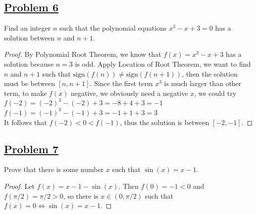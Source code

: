 \documentclass[10pt,letterpaper]{article}
\begin{document}
	
	\subsection*{{\color{purple}\underline{Problem 6}}}
	Find an integer $n$ such that the polynomial equations $x^3 - x + 3 = 0$ has a solution
	between $n$ and $n + 1$.
	\begin{proof}
	By Polynomial Root Theorem, we know that $f(x) = x^3 - x + 3$ has a solution because $n = 3$ is odd.
		Apply Location of Root Theorem, we want to find $n$ and $n + 1$ such that $\mathrm{sign}(f(n)) \neq \mathrm{sign}(f(n+1))$,
		then the solution must be between $[n, n+1]$. Since the first term $x^3$ is much larger than other term, to make $f(x)$ negative,
		we obviously need a negative $x$, we could try \\
		$f(-2) = (-2)^3 - (-2) + 3 = -8 + 4 + 3 = -1$ \\
		$f(-1) = (-1)^3 - (-1) + 3 = -1 + 1 + 3 = 3$ \\
		It follows that $f(-2) < 0 < f(-1)$, thus the solution is between $[-2, -1]$.
	\end{proof}
	
	\subsection*{{\color{purple}\underline{Problem 7}}}
	Prove that there is some number $x$ such that $\sin(x) = x - 1$.
	\begin{proof}
		Let $f(x) = x − 1 − \sin(x)$. Then $f(0) = −1 < 0$ and $f(\pi/2) = \pi/2 > 0$, so there is $
		x \in (0, \pi/2)$ such that
		$f(x) = 0 \Leftrightarrow \sin(x) = x − 1$.
	\end{proof}
	
\end{document}
